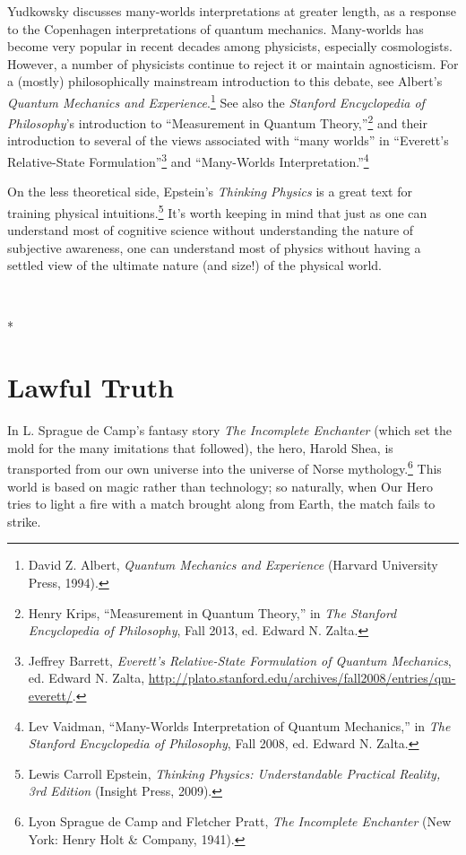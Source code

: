 {
 Yudkowsky discusses many-worlds interpretations at greater length,
as a response to the Copenhagen interpretations of quantum mechanics.
Many-worlds has become very popular in recent decades among physicists,
especially cosmologists. However, a number of physicists continue to
reject it or maintain agnosticism. For a (mostly) philosophically
mainstream introduction to this debate, see Albert's
\textit{Quantum Mechanics and Experience}.\footnote{David Z. Albert, \textit{Quantum Mechanics and Experience}
(Harvard University Press, 1994).} See also
the \textit{Stanford Encyclopedia of Philosophy}'s
introduction to ``Measurement in Quantum
Theory,''\footnote{Henry Krips, ``Measurement in Quantum
Theory,'' in \textit{The Stanford Encyclopedia of
Philosophy}, Fall 2013, ed. Edward N. Zalta.} and their introduction
to several of the views associated with ``many
worlds'' in
``Everett's Relative-State
Formulation''\footnote{Jeffrey Barrett, \textit{Everett's
Relative-State Formulation of Quantum Mechanics}, ed. Edward N. Zalta,
\url{http://plato.stanford.edu/archives/fall2008/entries/qm-everett/}.} and
``Many-Worlds
Interpretation.''\footnote{Lev Vaidman, ``Many-Worlds Interpretation of
Quantum Mechanics,'' in \textit{The Stanford
Encyclopedia of Philosophy}, Fall 2008, ed. Edward N. Zalta.}}

{
 On the less theoretical side, Epstein's
\textit{Thinking Physics} is a great text for training physical
intuitions.\footnote{Lewis Carroll Epstein, \textit{Thinking Physics:
Understandable Practical Reality, 3rd Edition} (Insight Press, 2009).} It's worth keeping in
mind that just as one can understand most of cognitive science without
understanding the nature of subjective awareness, one can understand
most of physics without having a settled view of the ultimate nature
(and size!) of the physical world.}

{
 ~}

{\centering
 *
\par}


\bigskip

\chapter{Lawful Truth}


{
 In L. Sprague de Camp's fantasy story \textit{The
Incomplete Enchanter} (which set the mold for the many imitations that
followed), the hero, Harold Shea, is transported from our own universe
into the universe of Norse mythology.\footnote{Lyon Sprague de Camp and Fletcher Pratt, \textit{The Incomplete
Enchanter} (New York: Henry Holt \& Company, 1941).} This world is
based on magic rather than technology; so naturally, when Our Hero
tries to light a fire with a match brought along from Earth, the match
fails to strike. }

